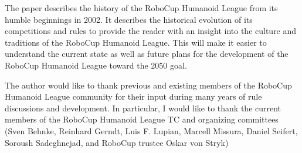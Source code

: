 \documentclass{llncs}
\begin{document}
The paper describes the history of the RoboCup Humanoid League from
its humble beginnings in 2002. It describes the historical evolution
of its competitions and rules to provide the reader with an insight
into the culture and traditions of the RoboCup Humanoid League. This
will make it easier to understand the current state as well as future
plans for the development of the RoboCup Humanoid League toward the
2050 goal.

The author would like to thank previous and existing members of the
RoboCup Humanoid League community for their input during many years of
rule discussions and development. In particular, I would like to thank
the current members of the RoboCup Humanoid League TC and organizing
committees (Sven Behnke, Reinhard Gerndt, Luis F. Lupian, Marcell
Missura, Daniel Seifert, Soroush Sadeghnejad, and RoboCup trustee
Oskar von Stryk)
\end{document}

